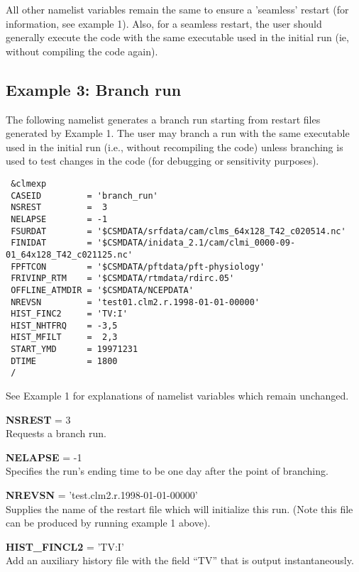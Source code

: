 \medskip \noindent 
All other namelist variables remain the same to ensure a 'seamless'
restart (for information, see example 1). Also, for a seamless
restart, the user should generally execute the code with the same
executable used in the initial run (ie, without compiling the code
again).

\subsection {Example 3: Branch run}

\noindent 
The following namelist generates a branch run starting from restart
files generated by Example 1.  The user may branch a run with the same
executable used in the initial run (i.e., without recompiling the
code) unless branching is used to test changes in the code (for
debugging or sensitivity purposes).

\begin{verbatim}
 &clmexp 
 CASEID         = 'branch_run' 
 NSREST         =  3 
 NELAPSE        = -1 
 FSURDAT        = '$CSMDATA/srfdata/cam/clms_64x128_T42_c020514.nc'
 FINIDAT        = '$CSMDATA/inidata_2.1/cam/clmi_0000-09-01_64x128_T42_c021125.nc'
 FPFTCON        = '$CSMDATA/pftdata/pft-physiology' 
 FRIVINP_RTM    = '$CSMDATA/rtmdata/rdirc.05'
 OFFLINE_ATMDIR = '$CSMDATA/NCEPDATA' 
 NREVSN         = 'test01.clm2.r.1998-01-01-00000' 
 HIST_FINC2     = 'TV:I'
 HIST_NHTFRQ    = -3,5 
 HIST_MFILT     =  2,3
 START_YMD      = 19971231 
 DTIME          = 1800 
 / 
\end{verbatim}

\medskip \noindent 
See Example 1 for explanations of namelist variables which remain
unchanged.

\medskip \noindent 
{\bf NSREST} = 3 \\
Requests a branch run.

\medskip \noindent 
{\bf NELAPSE} = -1 \\
Specifies the run's ending time to be one day after the
point of branching.

\medskip \noindent 
{\bf NREVSN} = 'test.clm2.r.1998-01-01-00000' \\
Supplies the name of the restart file which will initialize this run.
(Note this file can be produced by running example 1 above).

\medskip \noindent 
{\bf HIST\_FINCL2} = 'TV:I' \\
Add an auxiliary history file with the field ``TV'' that is output instantaneously.


